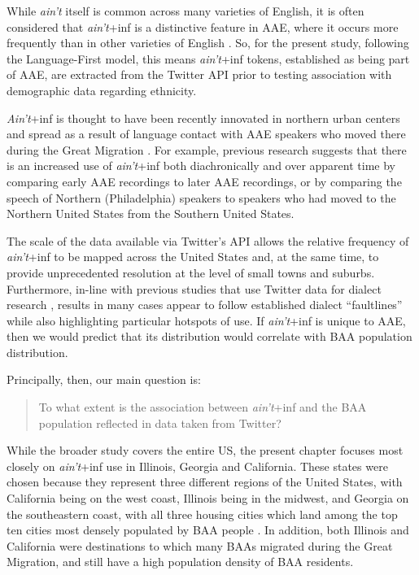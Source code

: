 \documentclass[output=paper,colorlinks,citecolor=brown,draftmode]{langscibook}
\begin{document}
While \textit{ain’t} itself is common across many varieties of English,  it is often considered that \textit{ain't}+inf is a distinctive feature in AAE, where it occurs more frequently than in other varieties of English \citep{fisher2022,labov1986,kautzsch2012}. So, for the present study, following the Language-First model, this means \textit{ain't}+inf tokens, established as being part of AAE, are extracted from the Twitter API prior to testing association with demographic data regarding ethnicity.

\textit{Ain't}+inf is thought to have been recently innovated in northern urban centers and spread as a result of language contact with AAE speakers who moved there during the Great Migration \citep{fisher2022}. For example, previous research \citep{JørgensenHovySøgaard2015} suggests that there is an increased use of \textit{ain't}+inf both diachronically and over apparent time by comparing early AAE recordings to later AAE recordings, or by comparing the speech of Northern (Philadelphia) speakers to speakers who had moved to the Northern United States from the Southern United States.

The scale of the data available via Twitter’s API allows the relative frequency of \textit{ain't}+inf to be mapped across the United States and, at the same time, to provide unprecedented resolution at the level of small towns and suburbs. Furthermore, in-line with previous studies that use Twitter data for dialect research \citep{jones2015a,stevenson2016,willis2020,strelluf2019,strelluf2020}, results in many cases appear to follow established dialect ``faultlines'' \citep[1]{eisenstein2013} while also highlighting particular hotspots of use. If \textit{ain't}+inf is unique to AAE, then we would predict that its distribution would correlate with BAA population distribution.

Principally, then, our main question is:
\begin{quote}
To what extent is the association between \textit{ain't}+inf and the BAA population reflected in data taken from Twitter?
\end{quote}

While the broader study covers the entire US, the present chapter focuses most closely on \textit{ain't}+inf use in Illinois, Georgia and California. These states were chosen because they represent three different regions of the United States, with California being on the west coast, Illinois being in the midwest, and Georgia on the southeastern coast, with all three housing cities which land among the top ten cities most densely populated by BAA people \citep{tamir2021}.  In addition, both Illinois and California were destinations to which many BAAs migrated during the Great Migration, and still have a high population density of BAA residents.
\end{document}
